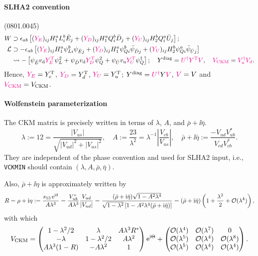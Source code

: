 \documentclass[CheatSheet]{subfiles}
\begin{document}
\paragraph{SLHA2 convention} (0801.0045)
\begin{align}
 W &\supset \epsilon_{ab}\left[
({\color{magenta}Y_E})_{ij}H_1^a L_i^b \bar E_j
+({\color{magenta}Y_D})_{ij}H_1^a Q_i^b \bar D_j
+({\color{magenta}Y_U})_{ij}H_2^b Q_i^a \bar U_j
\right];
\\
\mathcal L&\supset
- \epsilon_{ab}\left[
({\color{magenta}Y_E})_{ij}H_1^a \psi_{Li}^b \psi_{\bar Ej}
+({\color{magenta}Y_D})_{ij}H_1^a \psi_{Qi}^b \bar \psi_{\bar Dj}
+({\color{magenta}Y_U})_{ij}H_2^b \psi_{Qi}^a \bar \psi_{\bar Uj}
\right]
\\&\leadsto
- \left[
\psi_{\bar E}v_{\mathrm{d}} {\color{magenta}Y_E^{\mathrm{T}}}\psi_L^2
+\psi_{\bar D}v_{\mathrm{d}}{\color{magenta}Y_D^{\mathrm{T}}}\psi_Q^2
+\psi_{\bar U}v_{\mathrm{u}}{\color{magenta}Y_U^{\mathrm{T}}}\psi_Q^1
\right];
\quad
Y^{\mathrm{diag}} = {\color{magenta}U^\dagger Y^{\mathrm{T}} V},
\quad
{\color{magenta}V_{\mathrm{CKM}}} = {\color{magenta}V_u^\dagger V_d}.
\end{align}
Hence, ${\color{magenta}Y_E}=Y_{e}^{\mathrm{T}}$, ${\color{magenta}Y_D}=Y_{d}^{\mathrm{T}}$, ${\color{magenta}Y_U}=Y_{u}^{\mathrm{T}}$;
$Y^{\mathrm{diag}}={\color{magenta}U^\dagger}Y{\color{magenta}V}$, ${\color{magenta}V}=V$ and ${\color{magenta}V_{\mathrm{CKM}}}=V_{\mathrm{CKM}}$.

\paragraph{Wolfenstein parameterization}
The CKM matrix is precisely written in terms of $\lambda$, $A$, and $\bar\rho+\ii\bar\eta$.
\begin{equation}
  \lambda := \si{12} = \frac{|V_{us}|}{\sqrt{|V_{ud}|^2+|V_{us}|^2}},
\quad
  A:=\frac{\si{23}}{\lambda^2}=\lambda^{-1}\left|\frac{V_{cb}}{V_{us}}\right|,
\quad
\bar\rho+\ii\bar\eta:=\frac{-V_{ud}V^*_{ub}}{V_{cd}V^*_{cb}}.
\end{equation}
They are independent of the phase convention and used for SLHA2 input, i.e., \texttt{VCKMIN} should contain $(\lambda, A, \bar\rho, \bar\eta)$.

Also, $\bar\rho+\ii\eta$ is approximately written by
\begin{equation}
 R=\rho+\mathrm{i}\eta:=\frac{s_{13}\mathop{}\!\mathrm{e}^{\mathrm{i}\delta}}{A\lambda^3}
=\frac{V^*_{ub}}{A\lambda^3}\frac{V_{ud}}{|V_{ud}|}
= \frac{(\bar\rho+\mathrm{i}\bar\eta)\sqrt{1-A^2\lambda^4}}
        {\sqrt{1-\lambda^2}\left[1-A^2\lambda^4(\bar\rho+\mathrm{i}\bar\eta)\right]}
= \left(\bar\rho+\mathrm{i}\bar\eta\right)\left(1+\frac{\lambda^2}{2}+\operatorname{\mathcal{O}}(\lambda^4)\right),
\end{equation}
with which
\begin{equation}
 V_{\mathrm{CKM}}
=\begin{pmatrix}
 1-\lambda^2/2 & \lambda       & A\lambda^3R^*\\
 -\lambda      & 1-\lambda^2/2 & A\lambda^2\\
 A\lambda^3(1-R) & -A\lambda^2 & 1
\end{pmatrix}\mathop{}\!\mathrm{e}^{\mathrm{i}\Theta}
+\begin{pmatrix}
\operatorname{\mathcal{O}}(\lambda^4) & \operatorname{\mathcal{O}}(\lambda^7) & 0\\
\operatorname{\mathcal{O}}(\lambda^5) & \operatorname{\mathcal{O}}(\lambda^4) & \operatorname{\mathcal{O}}(\lambda^8)\\
\operatorname{\mathcal{O}}(\lambda^5) & \operatorname{\mathcal{O}}(\lambda^4) & \operatorname{\mathcal{O}}(\lambda^4)
\end{pmatrix}.
\end{equation}
\end{document}
